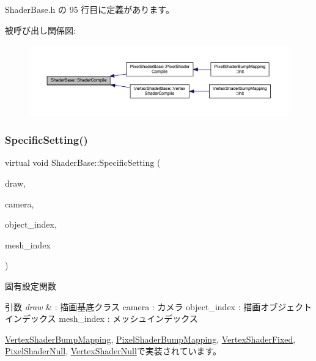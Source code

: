  Shader\+Base.\+h の 95 行目に定義があります。

被呼び出し関係図\+:
\nopagebreak
\begin{figure}[H]
\begin{center}
\leavevmode
\includegraphics[width=350pt]{class_shader_base_ac6e791440374f97592cfb4cb36f4fa55_icgraph}
\end{center}
\end{figure}
\mbox{\label{class_shader_base_ac78c78ede3b8e48cf28b739b97456620}} 
\subsubsection{\texorpdfstring{Specific\+Setting()}{SpecificSetting()}}
{\footnotesize\ttfamily virtual void Shader\+Base\+::\+Specific\+Setting (\begin{DoxyParamCaption}\item[{\mbox{\hyperlink{class_draw_base}{Draw\+Base}} $\ast$}]{draw,  }\item[{\mbox{\hyperlink{class_camera}{Camera}} $\ast$}]{camera,  }\item[{unsigned}]{object\+\_\+index,  }\item[{unsigned}]{mesh\+\_\+index }\end{DoxyParamCaption})\hspace{0.3cm}{\ttfamily [pure virtual]}}



固有設定関数 


\begin{DoxyParams}{引数}
{\em draw} & \+: 描画基底クラス camera \+: カメラ object\+\_\+index \+: 描画オブジェクトインデックス mesh\+\_\+index \+: メッシュインデックス \\
\hline
\end{DoxyParams}


\mbox{\hyperlink{class_vertex_shader_bump_mapping_ad81d57336763441c4071f967b57dbce1}{Vertex\+Shader\+Bump\+Mapping}}, \mbox{\hyperlink{class_pixel_shader_bump_mapping_afa80c2404b490a444d54cc47c681ca8f}{Pixel\+Shader\+Bump\+Mapping}}, \mbox{\hyperlink{class_vertex_shader_fixed_a87523c320f6f6767d59d7b24265db7ec}{Vertex\+Shader\+Fixed}}, \mbox{\hyperlink{class_pixel_shader_null_a8dd0194b5a22da5261ab35233a7cfdcd}{Pixel\+Shader\+Null}}, \mbox{\hyperlink{class_vertex_shader_null_aa2234c6ea083e3c0233d59f222145992}{Vertex\+Shader\+Null}}で実装されています。

